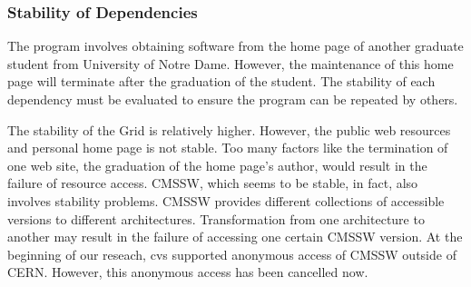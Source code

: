 \documentclass{acm_proc_article-sp}
\begin{document}
\subsubsection{Stability of Dependencies}

The program involves obtaining software from the home page of another graduate
student from University of Notre Dame. However, the maintenance of this
home page will terminate after the graduation of the student.
The stability of each dependency must be evaluated to ensure the program can be 
repeated by others.

The stability of the Grid is relatively higher. However, the
public web resources and personal home page is not stable. Too many factors
like the termination of one web site, the graduation of the home page's author,
would result in the failure of resource access. CMSSW, which seems to be
stable, in fact, also involves stability problems. CMSSW provides different
collections of accessible versions to different architectures. Transformation
from one architecture to another may result in the failure of accessing one
certain CMSSW version. At the beginning of our reseach, cvs supported
anonymous access of CMSSW outside of CERN. However, this anonymous access has
been cancelled now.
\end{document}
